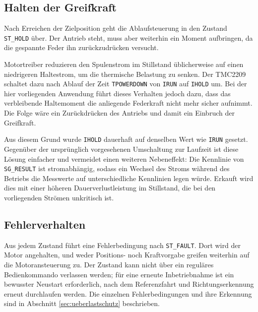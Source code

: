 \subsection*{Halten der Greifkraft}

Nach Erreichen der Zielposition geht die Ablaufsteuerung in den Zustand
\texttt{ST\_HOLD} über. Der Antrieb steht, muss aber weiterhin ein Moment aufbringen, da
die gespannte Feder ihn zurückzudrücken versucht.

Motortreiber reduzieren den Spulenstrom im Stillstand üblicherweise auf einen niedrigeren
Haltestrom, um die thermische Belastung zu senken. Der TMC2209 schaltet dazu nach Ablauf
der Zeit \texttt{TPOWERDOWN} von \texttt{IRUN} auf \texttt{IHOLD} um. Bei der hier
vorliegenden Anwendung führt dieses Verhalten jedoch dazu, dass das verbleibende
Haltemoment die anliegende Federkraft nicht mehr sicher aufnimmt. Die Folge wäre ein
Zurückdrücken des Antriebs und damit ein Einbruch der Greifkraft.

Aus diesem Grund wurde \texttt{IHOLD} dauerhaft auf denselben Wert wie \texttt{IRUN}
gesetzt. Gegenüber der ursprünglich vorgesehenen Umschaltung zur Laufzeit ist diese
Lösung einfacher und vermeidet einen weiteren Nebeneffekt: Die Kennlinie von
\texttt{SG\_RESULT} ist stromabhängig, sodass ein Wechsel des Stroms während des Betriebs
die Messwerte auf unterschiedliche Kennlinien legen würde. Erkauft wird dies mit einer
höheren Dauerverlustleistung im Stillstand, die bei den vorliegenden Strömen unkritisch
ist.

\subsection*{Fehlerverhalten}

Aus jedem Zustand führt eine Fehlerbedingung nach \texttt{ST\_FAULT}. Dort wird der Motor
angehalten, und weder Positions- noch Kraftvorgabe greifen weiterhin auf die
Motoransteuerung zu. Der Zustand kann nicht über ein reguläres Bedienkommando verlassen
werden; für eine erneute Inbetriebnahme ist ein bewusster Neustart erforderlich, nach dem
Referenzfahrt und Richtungserkennung erneut durchlaufen werden. Die einzelnen
Fehlerbedingungen und ihre Erkennung sind in Abschnitt \ref{sec:ueberlastschutz}
beschrieben.
